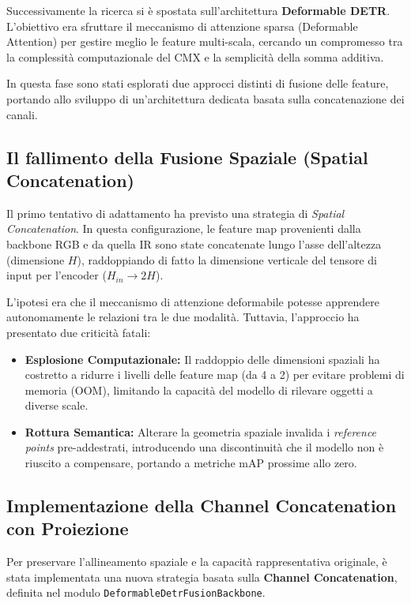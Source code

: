 \documentclass[a4paper,11pt]{article}
\begin{document}
Successivamente la ricerca si è spostata sull'architettura \textbf{Deformable DETR}. L'obiettivo era sfruttare il meccanismo di attenzione sparsa (Deformable Attention) per gestire meglio le feature multi-scala, cercando un compromesso tra la complessità computazionale del CMX e la semplicità della somma additiva.

In questa fase sono stati esplorati due approcci distinti di fusione delle feature, portando allo sviluppo di un'architettura dedicata basata sulla concatenazione dei canali.

\subsection{Il fallimento della Fusione Spaziale (Spatial Concatenation)}
Il primo tentativo di adattamento ha previsto una strategia di \textit{Spatial Concatenation}. In questa configurazione, le feature map provenienti dalla backbone RGB e da quella IR sono state concatenate lungo l'asse dell'altezza (dimensione $H$), raddoppiando di fatto la dimensione verticale del tensore di input per l'encoder ($H_{in} \rightarrow 2H$).

L'ipotesi era che il meccanismo di attenzione deformabile potesse apprendere autonomamente le relazioni tra le due modalità. Tuttavia, l'approccio ha presentato due criticità fatali:
\begin{itemize}
    \item \textbf{Esplosione Computazionale:} Il raddoppio delle dimensioni spaziali ha costretto a ridurre i livelli delle feature map (da 4 a 2) per evitare problemi di memoria (OOM), limitando la capacità del modello di rilevare oggetti a diverse scale.
    \item \textbf{Rottura Semantica:} Alterare la geometria spaziale invalida i \textit{reference points} pre-addestrati, introducendo una discontinuità che il modello non è riuscito a compensare, portando a metriche mAP prossime allo zero.
\end{itemize}

\subsection{Implementazione della Channel Concatenation con Proiezione}
Per preservare l'allineamento spaziale e la capacità rappresentativa originale, è stata implementata una nuova strategia basata sulla \textbf{Channel Concatenation}, definita nel modulo \newline \texttt{DeformableDetrFusionBackbone}.
\end{document}
